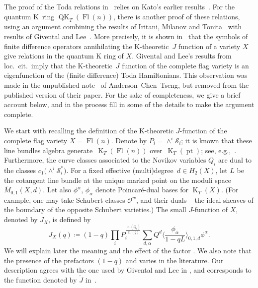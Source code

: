 \documentclass[11pt]{article}
\numberwithin{equation}{section}
\numberwithin{equation}{section}
\theoremstyle{definition}
\DeclareMathOperator{\Fl}{Fl}
\DeclareMathOperator{\QK}{QK}
\DeclareMathOperator{\K}{K}
\DeclareMathOperator{\pt}{pt}
\newcommand{\cO}{{\mathcal O}}
\newcommand{\cS}{{\mathcal S}}
\begin{document}
The proof of the Toda relations in~\cite{maeno.naito.sagaki:QKideal}
relies on Kato's earlier results~\cite{kato:loop}. For the quantum K~ring
$\QK_T(\Fl(n))$, there is another proof of these relations, using an argument
combining the results of Iritani, Milanov and
Tonita~\cite{Iritani:2013qka} with results of Givental
and Lee~\cite{givental_lee}. More precisely, it is shown in~\cite{Iritani:2013qka} that
the symbols of finite
difference operators annihilating the K-theoretic~$J$ function of a variety $X$ give relations in the quantum K ring of $X$. Givental and Lee's results from loc.\ cit.\ imply that the
K-theoretic~$J$ function of the complete flag variety is an eigenfunction of the
(finite difference) Toda Hamiltonians. This observation was made in the unpublished note~\cite{act:2017} of Anderson--Chen--Tseng, but removed from the published version of their paper. For the sake of completeness, we give a brief account below, and in the process fill in some of the details to make the argument complete.

We start with recalling the definition
of the K-theoretic $J$-function of the complete flag variety $X=\Fl(n)$.
Denote by $P_i= \wedge^i \cS_i$; it is known that these line bundles algebra generate~$\K_T(\Fl(n))$
over~$\K_T(\pt)$; see, e.g.,~\cite[Proposition~3.1]{GMSXZZ:Nakayama}. Furthermore,
the curve classes associated to the Novikov variables
$Q_i$ are dual to the classes
$c_1\bigl(\wedge^i \cS_i^*\bigr)$.
For a fixed effective (multi)degree~${d \in H_2(X)}$, let $L$ be the cotangent line bundle at the unique marked point on the moduli space $\overline{M}_{0,1}(X,d)$.
Let also $\phi^\alpha$, $\phi_\alpha$ denote Poincar\'e-dual bases for $\K_T(X)$. (For example,
one may take Schubert classes $\cO^w$, and their duals -- the ideal sheaves of the boundary of the opposite Schubert varieties.)
The small $J$-function of $X$, denoted by $J_X$, is defined by
\[
J_X(q)\coloneq (1-q)\prod_i P_i^{\frac{\ln(Q_i)}{\ln(q)}}\sum_{d,\alpha} Q^d\biggl\langle \frac{\phi_\alpha}{1-qL}\biggr\rangle_{0,1,d}\phi^\alpha .
\]
We will explain later the meaning and the effect of the factor
. We also note that the presence
of the prefactors $(1-q)$
and  varies in the literature.
Our description agrees with the one used by Givental and Lee in
\cite{givental_lee}, and corresponds to the function denoted by $\tilde{J}$ in~\cite{Iritani:2013qka}.
\end{document}
